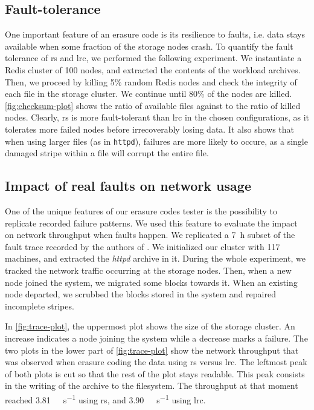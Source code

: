 \subsection{Fault-tolerance}
\label{subsec:fault-tolerance}

One important feature of an erasure code is its resilience to faults, i.e. data stays available when some fraction of the storage nodes crash.
To quantify the fault tolerance of \ac{rs} and \ac{lrc}, we performed the following experiment. 
We instantiate a Redis cluster of 100 nodes, and extracted the contents of the workload archives.%
Then, we proceed by killing 5\% random Redis nodes and check the integrity of each file in the storage cluster.
We continue until 80\% of the nodes are killed.
\autoref{fig:checksum-plot} shows the ratio of available files against to the ratio of killed nodes.
Clearly, \ac{rs} is more fault-tolerant than \ac{lrc} in the chosen configurations, as it tolerates more failed nodes before irrecoverably losing data.
It also shows that when using larger files (as in \texttt{httpd}), failures are more likely to occure, as a single damaged stripe within a file will corrupt the entire file.

\subsection{Impact of real faults on network usage}
\label{subsec:fault-trace}

One of the unique features of our erasure codes tester is the possibility to replicate recorded failure patterns.
We used this feature to evaluate the impact on network throughput when faults happen.
We replicated a \SI{7}{\hour} subset of the fault trace recorded by the authors of \autocite{websites02}.
We initialized our cluster with 117 machines, and extracted the \textit{httpd} archive in it.
During the whole experiment, we tracked the network traffic occurring at the storage nodes.
Then, when a new node joined the system, we migrated some blocks towards it.
When an existing node departed, we scrubbed the blocks stored in the system and repaired incomplete stripes.

In \autoref{fig:trace-plot}, the uppermost plot shows the size of the storage cluster.
An increase indicates a node joining the system while a decrease marks a failure.
The two plots in the lower part of \autoref{fig:trace-plot} show the network throughput that was observed when erasure coding the data using \ac{rs} versus \ac{lrc}.
The leftmost peak of both plots is cut so that the rest of the plot stays 
readable.
This peak consists in the writing of the archive to the filesystem.
The throughput at that moment reached \SI{3.81}{\mega\byte\per\second} using 
\ac{rs}, and \SI{3.90}{\mega\byte\per\second} using \ac{lrc}.

